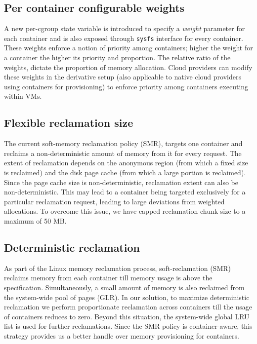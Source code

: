     
    \subsection{Per container configurable weights}
      A new per-cgroup state variable is introduced to specify a \emph{weight}
      parameter for each container and is also
      exposed through \texttt{sysfs} interface for every container.
      These weights enforce a notion of priority among containers; 
      higher the weight for a container the higher its priority and proportion.
      The relative ratio of the weights, dictate the proportion of memory allocation.
      Cloud providers can modify these weights in the derivative setup 
      (also applicable to native cloud providers using 
      containers for provisioning) to enforce priority among containers 
      executing within VMs.
    
    \subsection{Flexible reclamation size}
      The current soft-memory reclamation policy (SMR), targets one container and 
      reclaims a non-deterministic amount of memory from it for every 
      request. The extent of reclamation depends on the anonymous region (from which
      a fixed size is reclaimed) and the disk page cache (from which a large
      portion is reclaimed). Since the page cache size is non-deterministic,
      reclamation extent can also be non-deterministic.
      This may lead to a container being targeted exclusively for a particular 
      reclamation request, leading to large deviations 
      from weighted allocations. To overcome this issue, we have 
      capped reclamation chunk size to a maximum of 50 MB. 
    
    \subsection{Deterministic reclamation}
      As part of the Linux \cg{} memory reclamation process, soft-reclamation (SMR)
      reclaims memory from each container till memory usage is above the
      \sol specification. Simultaneously, a small amount of memory is also
      reclaimed from the system-wide pool of pages (GLR). In our solution,
      to maximize deterministic reclamation we perform proportionate
      reclamation across containers till the usage of containers reduces
      to zero. Beyond this situation, the system-wide global LRU list is
      used for further reclamations.
      Since the SMR policy is container-aware, this strategy
      provides us a better handle over memory provisioning for containers. 
    
